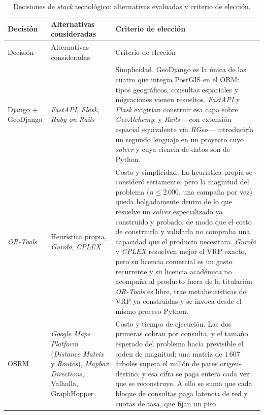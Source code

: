 \small
\begin{xltabular}{\textwidth}{@{}>{\raggedright\arraybackslash}p{2.0cm} >{\raggedright\arraybackslash}p{2.1cm} X@{}}
  \caption{Decisiones de \textit{stack} tecnológico: alternativas evaluadas y criterio de elección.}
  \label{tab:stack-decisions} \\
  \toprule
  Decisión & Alternativas consideradas & Criterio de elección \\
  \midrule
  \endfirsthead
  \toprule
  Decisión & Alternativas consideradas & Criterio de elección \\
  \midrule
  \endhead
  \bottomrule
  \endlastfoot
    Django + GeoDjango &
      \textit{FastAPI}, \textit{Flask}, \textit{Ruby on Rails} &
      Simplicidad. GeoDjango es la única de las cuatro que integra PostGIS en el ORM: tipos
      geográficos, consultas espaciales y migraciones vienen resueltos. \textit{FastAPI} y
      \textit{Flask} exigirían construir esa capa sobre \textit{GeoAlchemy}, y \textit{Rails} ---con
      extensión espacial equivalente vía \textit{RGeo}--- introduciría un segundo lenguaje en un
      proyecto cuyo \textit{solver} y cuya ciencia de datos son de Python. \\
      \addlinespace
    \textit{OR-Tools} &
      Heurística propia, \textit{Gurobi}, \textit{CPLEX} &
      Costo y simplicidad. La heurística propia se consideró seriamente, pero la magnitud del
      problema ($n \leq 2\,000$, una campaña por vez) queda holgadamente dentro de lo que resuelve
      un \textit{solver} especializado ya construido y probado, de modo que el costo de construirla
      y validarla no compraba una capacidad que el producto necesitara. \textit{Gurobi} y
      \textit{CPLEX} resuelven mejor el VRP exacto, pero su licencia comercial es un gasto
      recurrente y su licencia académica no acompaña al producto fuera de la titulación.
      \textit{OR-Tools} es libre, trae metaheurísticas de VRP ya construidas y se invoca desde el
      mismo proceso Python. \\
      \addlinespace
    OSRM &
      \textit{Google Maps Platform} (\textit{Distance Matrix} y \textit{Routes}),
      \textit{Mapbox Directions}, Valhalla, GraphHopper &
      Costo y tiempo de ejecución. Las dos primeras cobran por consulta, y el tamaño esperado del
      problema hacía previsible el orden de magnitud: una matriz de $1\,607$ árboles supera el
      millón de pares origen-destino, y esa cifra se paga entera cada vez que se reconstruye. A ello
      se suma que cada bloque de consultas paga latencia de red y cuotas de tasa, que fijan un piso

\end{xltabular}
